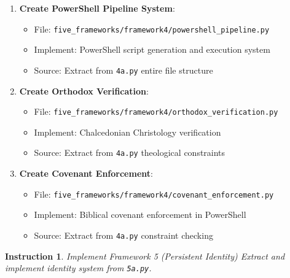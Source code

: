 \documentclass[12pt]{article}
\newtheorem{instruction}{Instruction}
\begin{document}
\begin{enumerate}
    \item \textbf{Create PowerShell Pipeline System}:
    \begin{itemize}
        \item File: \texttt{five\_frameworks/framework4/powershell\_pipeline.py}
        \item Implement: PowerShell script generation and execution system
        \item Source: Extract from \texttt{4a.py} entire file structure
    \end{itemize}

    \item \textbf{Create Orthodox Verification}:
    \begin{itemize}
        \item File: \texttt{five\_frameworks/framework4/orthodox\_verification.py}
        \item Implement: Chalcedonian Christology verification
        \item Source: Extract from \texttt{4a.py} theological constraints
    \end{itemize}

    \item \textbf{Create Covenant Enforcement}:
    \begin{itemize}
        \item File: \texttt{five\_frameworks/framework4/covenant\_enforcement.py}
        \item Implement: Biblical covenant enforcement in PowerShell
        \item Source: Extract from \texttt{4a.py} constraint checking
    \end{itemize}
\end{enumerate}

\begin{instruction}{Implement Framework 5 (Persistent Identity)}
Extract and implement identity system from \texttt{5a.py}.
\end{instruction}
\end{document}
